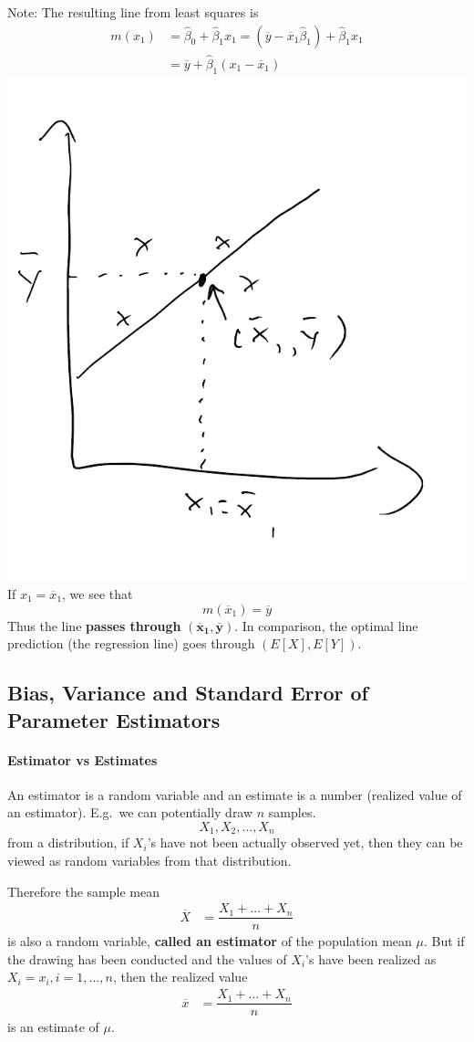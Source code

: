 \documentclass[12 pt]{article}
\begin{document}
Note: The resulting line from least squares is
\begin{align*}
  m(x_1) & = \hat{\beta}_0 + \hat{\beta}_1 x_1 = (\overline{y} - \overline{x}_1 \hat{\beta}_1) + \hat{\beta}_1 x_1
  \\ & = \overline{y} + \hat{\beta}_1 (x_1 - \overline{x}_1)
\end{align*}
\includegraphics[width=.5\textwidth]{11.pdf}
\\ If $x_1 = \overline{x}_1$, we see that
$$m(\overline{x}_1) = \overline{y}$$
Thus the line \textbf{passes through} $\mathbf{(\overline{x}_1, \overline{y})}$. In comparison, the optimal line prediction (the
regression line) goes through $(E[X], E[Y])$.
\subsection{Bias, Variance and Standard Error of Parameter Estimators}
\paragraph{Estimator vs Estimates} An estimator is a random variable
and an estimate is a number (realized value of an estimator). E.g.\ we
can potentially draw $n$ samples.
$$X_1, X_2, \ldots, X_n$$
from a distribution, if $X_i$'s have not been actually observed yet,
then they can be viewed as random variables from that distribution.

Therefore the sample mean
\begin{align*}
  \overline{X} & = \dfrac{X_1 + \ldots + X_n}{n}
\end{align*}
is also a random variable, \textbf{called an estimator} of the
population mean $\mu$. But if the drawing has been conducted and the
values of $X_i$'s have been realized as $X_i = x_i, i = 1, \ldots, n$,
then the realized value
\begin{align*}
  \overline{x} & = \dfrac{X_1 + \ldots + X_n}{n}
\end{align*}
is an estimate of $\mu$.
\end{document}
